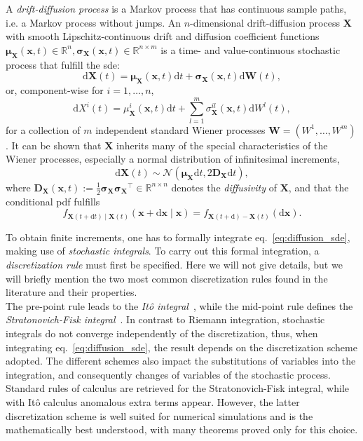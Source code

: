 \documentclass[a4paper,12pt]{book}
\begin{document}
A \textit{drift-diffusion process} is a Markov process that has continuous sample paths, i.e. a Markov process without jumps. An $n$-dimensional drift-diffusion process $\bm{X}$ with smooth Lipschitz-continuous drift and diffusion coefficient functions $\bm{\mu_X}(\bm{x},t) \in \mathbb{R}^n,\bm{\sigma_X}(\bm{x},t) \in \mathbb{R}^{n \times m}$ is a time- and value-continuous stochastic process that fulfill the \acrshort{sde}:
\begin{equation}
    \label{eq:diffusion_sde}
    \mathrm{d}\bm{X}(t)= \bm{\mu_X}(\bm{x},t) \mathrm{d}t + \bm{\sigma_X}(\bm{x},t)\mathrm{d}\bm{W}(t),
\end{equation}
or, component-wise for $i=1, \ldots, n$,
\begin{equation}
    \mathrm{d}X^i(t)=\mu_{\bm{X}}^i(\bm{x},t)\mathrm{d}t +\sum_{l=1}^m \sigma_{\bm{X}}^{i l}(\bm{x},t)\mathrm{d}W^l(t),
\end{equation}
for a collection of $m$ independent standard Wiener processes $\bm{W}=\left(W^1, \ldots, W^m\right)$. It can be shown that $\bm{X}$ inherits many of the special characteristics of the Wiener processes, especially a normal distribution of infinitesimal increments,
\begin{equation}
   \mathrm{d}\bm{X}(t) \sim \mathcal{N}\left(\bm{\mu_X} \mathrm{d}t, 2 \bm{D_X} \mathrm{d}t\right),
\end{equation}
where $\bm{D_X}(\bm{x},t):=\frac{1}{2} \bm{\sigma_X} \bm{\sigma_X}^{\top} \in \mathbb{R}^{n \times n}$ denotes the \textit{diffusivity} of $\bm{X}$, and that the conditional \acrshort{pdf} fulfills
\begin{equation}
    f_{\bm{X}(t+\mathrm{d}t) \mid \bm{X}(t)}(\bm{x}+\mathrm{d}\bm{x} \mid \bm{x})=f_{\bm{X}(t+\mathrm{d})-\bm{X}(t)}(\mathrm{d}\bm{x}).
\end{equation}

To obtain finite increments, one has to formally integrate eq.~\eqref{eq:diffusion_sde}, making use of \textit{stochastic integrals}. To carry out this formal integration, a \textit{discretization rule} must first be specified. Here we will not give details, but we will briefly mention the two most common discretization rules found in the literature and their properties. \\

The pre-point rule leads to the \textit{Itô integral}~\parencite{Ito1944}, while the mid-point rule defines the \textit{Stratonovich-Fisk integral}~\parencite{Stratonovich1966,fisk1965}. In contrast to Riemann integration, stochastic integrals do not converge independently of the discretization, thus, when integrating eq.~\eqref{eq:diffusion_sde}, the result depends on the discretization scheme adopted. The different schemes also impact the substitutions of variables into the integration, and consequently changes of variables of the stochastic process. Standard rules of calculus are retrieved for the Stratonovich-Fisk integral, while with Itô calculus anomalous extra terms appear. However, the latter discretization scheme is well suited for numerical simulations and is the mathematically best understood, with many theorems proved only for this choice. 
\end{document}
